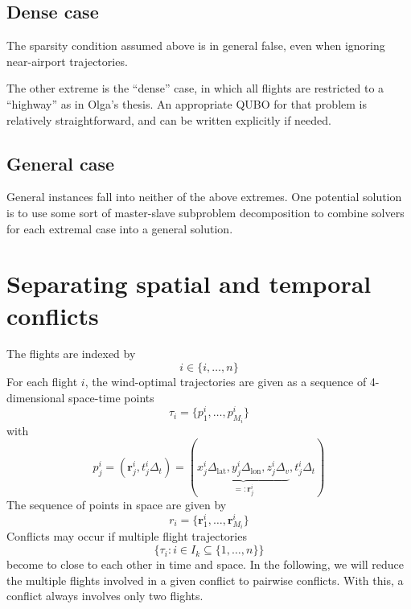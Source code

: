 \documentclass{article}
\begin{document}
\subsection{Dense case}
The sparsity condition assumed above is in general false, even when ignoring near-airport trajectories.

The other extreme is the ``dense'' case, in which all flights are restricted to a ``highway'' as in Olga's thesis.
An appropriate QUBO for that problem is relatively straightforward, and can be written explicitly if needed.

\subsection{General case}
General instances fall into neither of the above extremes.
One potential solution is to use some sort of master-slave subproblem decomposition to combine solvers for each extremal case into a general solution.

\section{Separating spatial and temporal conflicts}
The flights are indexed by
\begin{equation*}
    i \in \{i, \dots, n\}
\end{equation*}
For each flight $i$, the wind-optimal trajectories are given as a sequence of 4-dimensional space-time points
\begin{equation*}
    \tau_i = \{p^i_1, \dots, p^i_{M_i}\}
\end{equation*}
with
\begin{equation*}
    p^i_j = (\mathbf{r}^i_j, t^i_j \Delta_t) = \left( \underbrace{x^i_j \Delta_\text{lat}, y^i_j \Delta_\text{lon}, z^i_j \Delta_v}_{=:\mathbf{r}^i_j}, t^i_j \Delta_t\right)
\end{equation*}
The sequence of points in space are given by
\begin{equation*}
    r_i = \{\mathbf{r}^i_1, \dots, \mathbf{r}^i_{M_i}\}
\end{equation*}
Conflicts may occur if multiple flight trajectories
\begin{equation*}
    \{\tau_i : i \in I_k \subseteq \{1, \dots, n\}\}
\end{equation*}
become to close to each other in time and space.
In the following, we will reduce the multiple flights involved in a given conflict to pairwise conflicts.
With this, a conflict always involves only two flights.
\end{document}
